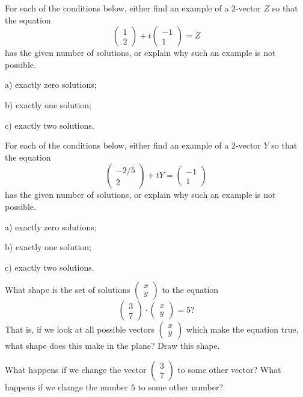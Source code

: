 \documentclass[elementsmain.tex]{subfiles}
\begin{document}
\begin{exercise}
For each of the conditions below, either find an example of a $2$-vector $Z$ so that the equation
\[
\begin{pmatrix}1\\2\end{pmatrix} + t\begin{pmatrix}-1\\1 \end{pmatrix} = Z
\]
has the given number of solutions, or explain why such an example is not possible.
\begin{compactitem}
\item[a)] exactly zero solutions;
\item[b)] exactly one solution; 
\item[c)] exactly two solutions.
\end{compactitem}
\end{exercise}

\begin{exercise}
For each of the conditions below, either find an example of a $2$-vector $Y$ so that the equation
\[
\begin{pmatrix}-2/5\\2\end{pmatrix} + tY = \begin{pmatrix}-1\\1 \end{pmatrix} 
\]
has the given number of solutions, or explain why such an example is not possible.
\begin{compactitem}
\item[a)] exactly zero solutions;
\item[b)] exactly one solution; 
\item[c)] exactly two solutions.
\end{compactitem}
\end{exercise}

\begin{exercise}
What shape is the set of solutions $\left(\begin{smallmatrix} x \\ y \end{smallmatrix}\right)$ to the equation
\[
\begin{pmatrix} 3 \\ 7\end{pmatrix} \cdot \begin{pmatrix} x \\ y \end{pmatrix} = 5?
\] 
That is, if we look at all possible vectors $\left(\begin{smallmatrix} x \\ y \end{smallmatrix}\right)$
which make the equation true, what shape does this make in the plane? Draw this shape.

What happens if we change the vector $\left(\begin{smallmatrix} 3 \\ 7 \end{smallmatrix}\right)$ to some other vector? What happens if we change the number $5$ to some other number?
\end{exercise}
\end{document}
